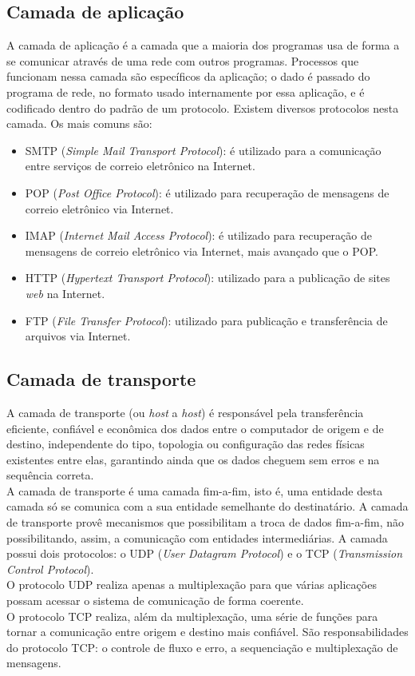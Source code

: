 \subsection{Camada de aplicação}
A camada de aplicação é a camada que a maioria dos programas usa de 
forma a se comunicar através de uma rede com outros programas. Processos que 
funcionam nessa camada são específicos da aplicação; o dado é passado do 
programa de rede, no formato usado internamente por essa aplicação, e é 
codificado dentro do padrão de um protocolo. Existem diversos protocolos nesta 
camada. Os mais comuns são:
\begin{itemize}
	\item SMTP (\textit{Simple Mail Transport Protocol}): é utilizado para a 
	comunicação entre serviços de correio eletrônico na Internet.
	\item POP (\textit{Post Office Protocol}): é utilizado para recuperação de 
	mensagens de correio eletrônico via Internet.
	\item IMAP (\textit{Internet Mail Access Protocol}): é utilizado para 
	recuperação de mensagens de correio eletrônico via Internet, mais 
	avançado que o POP.
	\item HTTP (\textit{Hypertext Transport Protocol}): utilizado para a 
	publicação de sites \textit{web} na Internet.
	\item FTP (\textit{File Transfer Protocol}): utilizado para publicação e 
	transferência de arquivos via Internet.
\end{itemize}
\subsection{Camada de transporte}
A camada de transporte (ou \textit{host} a \textit{host}) é responsável pela 
transferência eficiente, confiável e econômica dos dados entre o computador de 
origem e de destino, independente do tipo, topologia ou configuração das redes 
físicas existentes entre elas, garantindo ainda que os dados cheguem sem erros 
e na sequência correta.\\
A camada de transporte é uma camada fim-a-fim, isto é, uma entidade desta 
camada só se comunica com a sua entidade semelhante do destinatário. A camada 
de transporte provê mecanismos que possibilitam a troca de dados fim-a-fim, não 
possibilitando, assim, a comunicação com entidades intermediárias. A camada 
possui dois protocolos: o UDP (\textit{User Datagram Protocol}) e o TCP 
(\textit{Transmission Control Protocol}).\\
O protocolo UDP realiza apenas a multiplexação para que várias aplicações 
possam acessar o sistema de comunicação de forma coerente.\\
O protocolo TCP realiza, além da multiplexação, uma série de funções para 
tornar a comunicação entre origem e destino mais confiável. São 
responsabilidades do protocolo TCP: o controle de fluxo e erro, a 
sequenciação e multiplexação de mensagens.\\
